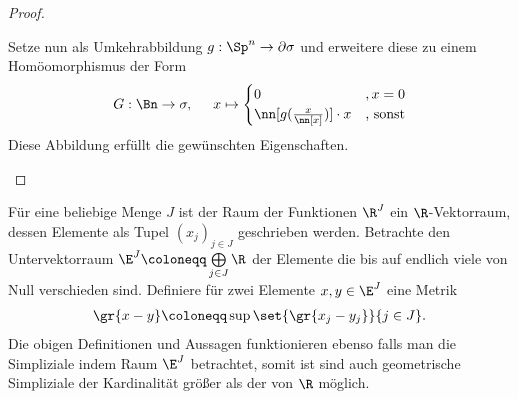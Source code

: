 \begin{Satz}
\begin{proof}
\begin{enumerate}[$a)$:]
      Setze nun als Umkehrabbildung $g : \Sp^n \rightarrow \partial\sigma$ 
      und erweitere diese zu einem Homöomorphismus der Form
      \begin{gather*}
        G : \Bn \rightarrow \sigma , \hspace{0.5cm}
        x \mapsto 
        \begin{cases}
          0 & , x = 0 \\
          \nn[g(\frac{x}{\nn[x]})] \cdot x & \text{, sonst}
        \end{cases}
      \end{gather*}
      Diese Abbildung erfüllt die gewünschten Eigenschaften.
    \end{enumerate}
  \end{proof}
\end{Satz}


\begin{Bem}
  Für eine beliebige Menge $J$ ist der Raum der Funktionen $\R^J$ ein
  $\R$-Vektorraum, dessen Elemente als Tupel $(x_j)_{j \in J}$
  geschrieben werden. Betrachte den Untervektorraum
  $\E^J \coloneqq \bigoplus\limits_{j \in J} \R$ der Elemente die bis
  auf endlich viele von Null verschieden sind. Definiere für zwei
  Elemente $x,y \in \E^J$ eine Metrik
  \begin{gather*}
    \gr{x-y} \coloneqq \sup \set{ \gr{x_j - y_j } }{ j \in J}.
  \end{gather*}
  Die obigen Definitionen und Aussagen funktionieren ebenso falls man
  die Simpliziale indem Raum $\E^J$ betrachtet, somit ist sind 
  auch geometrische Simpliziale der Kardinalität größer als der von $\R$
  möglich.
\end{Bem}




